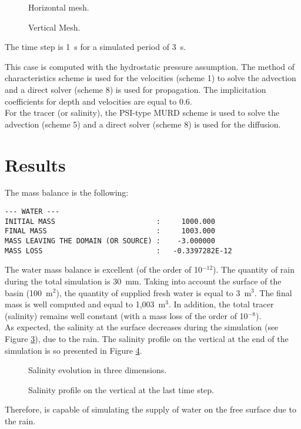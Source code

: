 \begin{figure}[!htbp]
 \centering
 \caption{Horizontal mesh.}
 \label{t3d:pluie:fig:meshH}
\end{figure}
\begin{figure}[!htbp]
 \centering
 \caption{Vertical Mesh.}
 \label{t3d:pluie:fig:meshV}
\end{figure}

\bigskip
The time step is 1~s for a simulated period of 3~s.

\bigskip
This case is computed with the hydrostatic pressure assumption.
The method of characteristics scheme
is used for the velocities (scheme 1) to solve the advection and
a direct solver (scheme 8) is used for propagation.
The implicitation coefficients for depth
and velocities are equal to 0.6.\\
For the tracer (or salinity), the PSI-type MURD scheme
is used to solve the advection (scheme 5) and
a direct solver (scheme 8) is used for the diffusion.

\section{Results}
\bigskip
The mass balance is the following:
\begin{lstlisting}[language=TelFortran]
--- WATER ---
INITIAL MASS                        :     1000.000
FINAL MASS                          :     1003.000
MASS LEAVING THE DOMAIN (OR SOURCE) :    -3.000000
MASS LOSS                           :   -0.3397282E-12
\end{lstlisting}
The water mass balance is excellent (of the order of 10$^{-12}$).
The quantity of rain during the total simulation is 30~mm.
Taking into account the surface of the basin (100~m$^2$), the quantity
of supplied fresh water is equal to 3~m$^3$. The final mass is well
computed and equal to 1,003~m$^3$.
In addition, the total tracer (salinity) remains well constant (with a mass loss of the order
of 10$^{-8}$).\\
As expected, the salinity at the surface decreases during the
simulation (see Figure \ref{t3d:pluie:fig:sal_evol}), due to the rain.
The salinity profile on the vertical at the end of the simulation is so
presented in Figure \ref{t3d:pluie:fig:sal_final}.

\begin{figure}[!htbp]
 \centering
 \caption{Salinity evolution in three dimensions.}
 \label{t3d:pluie:fig:sal_evol}
\end{figure}
\begin{figure}[!htbp]
 \centering
 \caption{Salinity profile on the vertical at the last time step.}
 \label{t3d:pluie:fig:sal_final}
\end{figure}

\bigskip
Therefore,  is capable of simulating the supply of water on the free
surface due to the rain.
